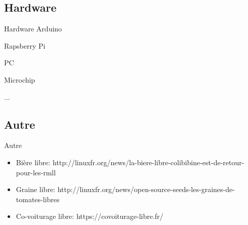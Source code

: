 \documentclass{beamer}
\begin{document}
\subsection{Hardware}
\begin{frame}{Hardware}
\noindent\vspace{0.1in}\hspace{1.2in} Arduino \par 		%
\noindent\vspace{0.1in}\hspace{2.8in} Rapsberry Pi \par	%
\noindent\vspace{0.1in}\hspace{1.5in} PC \par
\noindent\vspace{0.1in}\hspace{0.4in} Microchip \par
\noindent\vspace{0.1in}\hspace{2.2in} ... \par
\end{frame}

\subsection{Autre}
\begin{frame}{Autre} 
\begin{itemize}
	\item Bière libre: http://linuxfr.org/news/la-biere-libre-colibibine-est-de-retour-pour-les-rmll
	\item Graine libre: http://linuxfr.org/news/open-source-seeds-les-graines-de-tomates-libres
	\item Co-voiturage libre: https://covoiturage-libre.fr/
\end{itemize}
\end{frame}



\end{document}
